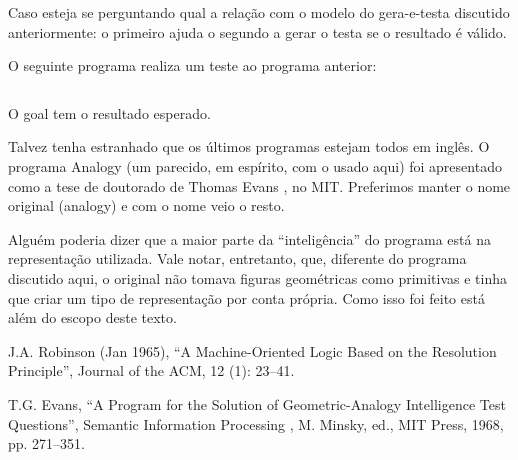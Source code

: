 \documentclass{article}
\begin{document}
Caso esteja se perguntando qual a relação com o modelo do gera-e-testa discutido anteriormente: o primeiro  ajuda o segundo a gerar o  testa se o resultado é válido.

O seguinte programa realiza um teste ao programa anterior:

%
\inputminted{prolog}{../Exemplos/Cap1/prog4_testanalogy.pl}

O goal  tem o resultado esperado.

Talvez tenha estranhado que os últimos programas estejam todos em inglês. O programa Analogy (um parecido, em espírito, com o usado aqui) foi apresentado como a tese de doutorado de Thomas Evans \cite{evans}, no MIT. Preferimos manter o nome original (analogy) e com o nome veio o resto.

Alguém poderia dizer que a maior parte da ``inteligência'' do programa está na representação utilizada.
Vale notar, entretanto, que, diferente do programa discutido aqui, o original não tomava figuras geométricas como
primitivas e tinha que criar um tipo de representação por conta própria. Como isso foi feito está além do escopo deste texto.


  \begin{thebibliography}{1}

    J.A. Robinson (Jan 1965), ``A Machine-Oriented Logic Based on the Resolution Principle'', Journal of the ACM, 12 (1): 23–41.

    T.G. Evans, “A Program for the Solution of Geometric-Analogy Intelligence Test Questions”, Semantic Information Processing , M. Minsky, ed., MIT Press, 1968, pp. 271–351.

  \end{thebibliography}
\end{document}
